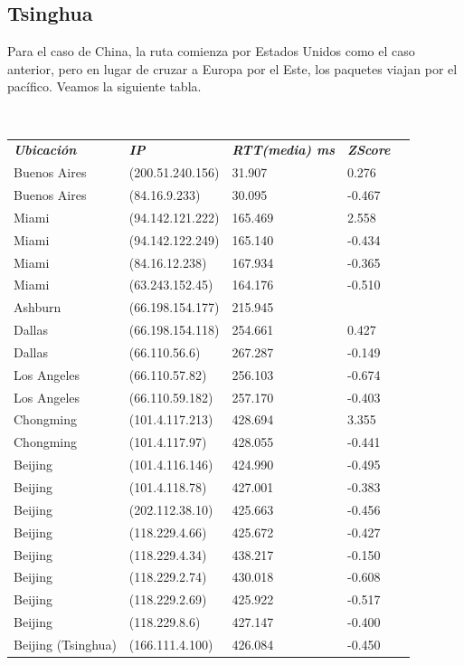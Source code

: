 \subsection{Tsinghua}

Para el caso de China, la ruta comienza por Estados Unidos como el caso anterior, pero en lugar de cruzar a Europa por el Este, los paquetes viajan por el pac\'ifico.
Veamos la siguiente tabla.

~

\begin{center}
\begin{tabular}{lllll}
	\textit{\textbf{Ubicaci\'on}}	&	\textit{\textbf{IP}}	&	\textit{\textbf{RTT(media) ms}}	&	\textit{\textbf{ZScore}}	\\
	Buenos Aires		&	(200.51.240.156)		&	31.907		&	0.276	\\
	Buenos Aires		&	(84.16.9.233)		&	30.095		&	-0.467	\\
	\intercontinental
	Miami		&	(94.142.121.222)		&	165.469		&	2.558	\\
	Miami		&	(94.142.122.249)		&	165.140		&	-0.434	\\
	Miami		&	(84.16.12.238)		&	167.934		&	-0.365	\\
	Miami		&	(63.243.152.45)		&	164.176		&	-0.510	\\
	Ashburn		&	(66.198.154.177)		&	215.945		&	\highestcontinental 0.714	\\
	Dallas		&	(66.198.154.118)		&	254.661		&	0.427	\\
	Dallas		&	(66.110.56.6)		&	267.287		&	-0.149	\\
	Los Angeles		&	(66.110.57.82)		&	256.103		&	-0.674	\\
	Los Angeles		&	(66.110.59.182)		&	257.170		&	-0.403	\\
	\intercontinental
	Chongming		&	(101.4.117.213)		&	428.694		&	3.355	\\
	Chongming		&	(101.4.117.97)		&	428.055		&	-0.441	\\
	Beijing		&	(101.4.116.146)		&	424.990		&	-0.495	\\
	Beijing		&	(101.4.118.78)		&	427.001		&	-0.383	\\
	Beijing		&	(202.112.38.10)		&	425.663		&	-0.456	\\
	Beijing		&	(118.229.4.66)		&	425.672		&	-0.427	\\
	Beijing		&	(118.229.4.34)		&	438.217		&	-0.150	\\
	Beijing		&	(118.229.2.74)		&	430.018		&	-0.608	\\
	Beijing		&	(118.229.2.69)		&	425.922		&	-0.517	\\
	Beijing		&	(118.229.8.6)		&	427.147		&	-0.400	\\
	Beijing (Tsinghua)		&	(166.111.4.100)		&	426.084		&	-0.450	\\
\end{tabular}
\end{center}

